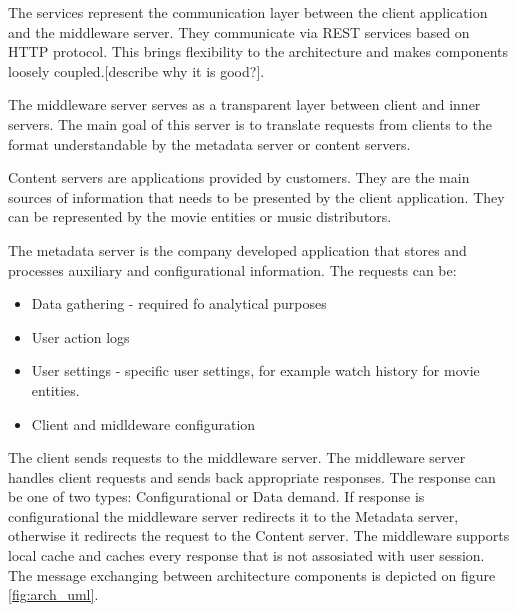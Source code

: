 The services represent the communication layer between the client application and the middleware server. They communicate via REST services based on HTTP protocol. This brings flexibility to the architecture and makes components loosely coupled.[describe why it is good?]. 

The middleware server serves as a transparent layer between client and inner servers. The main goal of this server is to translate requests from clients to the format understandable by the metadata server or content servers.  

Content servers are applications provided by customers. They are the main sources of information that needs to be presented by the client application. They can be represented by the movie entities or music distributors.

The metadata server is the company developed application that stores and processes auxiliary and configurational information. The requests can be: 

\begin{itemize}
	\item Data gathering - required fo analytical purposes
	\item User action logs 
	\item User settings - specific user settings, for example watch history for movie entities.
	\item Client and midldeware configuration
\end{itemize} 

The client sends requests to the middleware server. The middleware server handles client requests and sends back appropriate responses. The response can be one of two types: Configurational or Data demand. If response is configurational the middleware server redirects it to the Metadata server, otherwise it redirects the request to the Content server. The middleware supports local cache and caches every response that is not assosiated with user session. The message exchanging between architecture components is depicted on figure \ref{fig:arch_uml}.


